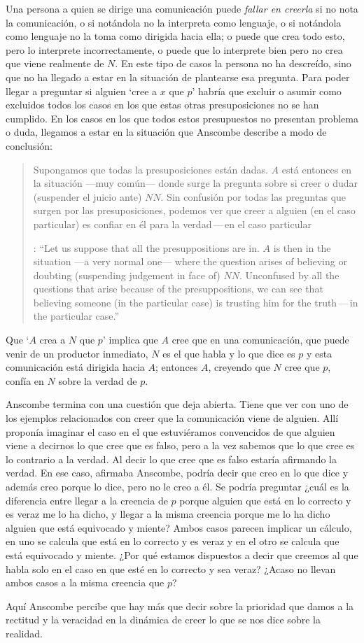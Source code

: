 Una persona a quien se dirige una comunicación puede \emph{fallar en creerla} si no nota la comunicación, o si notándola no la interpreta como lenguaje, o si notándola como lenguaje no la toma como dirigida hacia ella; o puede que crea todo esto, pero lo interprete incorrectamente, o puede que lo interprete bien pero no crea que viene realmente de $N$. En este tipo de casos la persona no ha descreído, sino que no ha llegado a estar en la situación de plantearse esa pregunta. Para poder llegar a preguntar si alguien `cree a $x$ que $p$' habría que excluir o asumir como excluidos todos los casos en los que estas otras presuposiciones no se han cumplido. En los casos en los que todos estos presupuestos no presentan problema o duda, llegamos a estar en la situación que Anscombe describe a modo de conclusión: \blockquote[{\cite[9]{anscombe2008faith:tobelieve}}: \enquote{Let us suppose that all the presuppositions are in. $A$ is then in the situation ---a very normal one--- where the question arises of believing or doubting (suspending judgement in face of) $NN$. Unconfused by all the questions that arise because of the presuppositions, we can see that believing someone (in the particular case) is trusting him for the truth\,---\,in the particular case.}]{Supongamos que todas la presuposiciones están dadas. $A$ está entonces en la situación ---muy común--- donde surge la pregunta sobre si creer o dudar (suspender el juicio ante) $NN$. Sin confusión por todas las preguntas que surgen por las presuposiciones, podemos ver que creer a alguien (en el caso particular) es confiar en él para la verdad\,---\,en el caso particular}. Que `$A$ crea a $N$ que $p$' implica que $A$ cree que en una comunicación, que puede venir de un productor inmediato, $N$ es el que habla y lo que dice es $p$ y esta comunicación está dirigida hacia $A$; entonces $A$, creyendo que $N$ cree que $p$, confía en $N$ sobre la verdad de $p$.

Anscombe termina con una cuestión que deja abierta. Tiene que ver con uno de los ejemplos relacionados con creer que la comunicación viene de alguien. Allí proponía imaginar el caso en el que estuviéramos convencidos de que alguien viene a decirnos lo que cree que es falso, pero a la vez sabemos que lo que cree es lo contrario a la verdad. Al decir lo que cree que es falso estaría afirmando la verdad. En ese caso, afirmaba Anscombe, podría decir que creo en lo que dice y además creo porque lo dice, pero no le creo a él. Se podría preguntar ¿cuál es la diferencia entre llegar a la creencia de $p$ porque alguien que está en lo correcto y es veraz me lo ha dicho, y llegar a la misma creencia porque me lo ha dicho alguien que está equivocado y miente? Ambos casos parecen implicar un cálculo, en uno se calcula que está en lo correcto y es veraz y en el otro se calcula que está equivocado y miente. ¿Por qué estamos dispuestos a decir que creemos al que habla solo en el caso en que esté en lo correcto y sea veraz? ¿Acaso no llevan ambos casos a la misma creencia que $p$?

Aquí Anscombe percibe que hay más que decir sobre la prioridad que damos a la rectitud y la veracidad en la dinámica de creer lo que se nos dice sobre la realidad.

